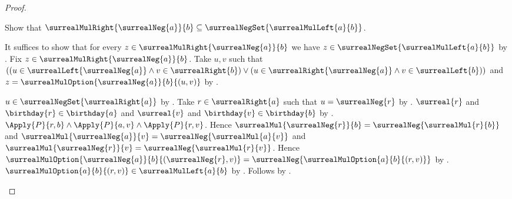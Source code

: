 \begin{proof}
\begin{subproof}
        Show that $\surrealMulRight{\surrealNeg{a}}{b}
            \subseteq\surrealNegSet{\surrealMulLeft{a}{b}}$.
        \begin{subproof}
            It suffices to show that for every
                $z\in\surrealMulRight{\surrealNeg{a}}{b}$ we have
                $z\in\surrealNegSet{\surrealMulLeft{a}{b}}$
                by .
            Fix $z\in\surrealMulRight{\surrealNeg{a}}{b}$.
            Take $u,v$ such that
                $((u\in\surrealLeft{\surrealNeg{a}}\land
                    v\in\surrealRight{b})
                  \lor
                  (u\in\surrealRight{\surrealNeg{a}}\land
                    v\in\surrealLeft{b}))$
                and $z=\surrealMulOption{\surrealNeg{a}}{b}{(u,v)}$
                by .
            \begin{byCase}
                    $u\in\surrealNegSet{\surrealRight{a}}$
                        by .
                    Take $r\in\surrealRight{a}$ such that
                        $u=\surrealNeg{r}$
                        by .
                    $\surreal{r}$ and
                        $\birthday{r}\in\birthday{a}$ and
                        $\surreal{v}$ and
                        $\birthday{v}\in\birthday{b}$
                        by .
                    $\Apply{P}{r,b}\land
                        \Apply{P}{a,v}\land
                        \Apply{P}{r,v}$.
                    Hence
                        $\surrealMul{\surrealNeg{r}}{b}
                            =\surrealNeg{\surrealMul{r}{b}}$ and
                        $\surrealMul{\surrealNeg{a}}{v}
                            =\surrealNeg{\surrealMul{a}{v}}$ and
                        $\surrealMul{\surrealNeg{r}}{v}
                            =\surrealNeg{\surrealMul{r}{v}}$.
                    Hence
                        $\surrealMulOption{\surrealNeg{a}}{b}
                            {(\surrealNeg{r},v)}
                        =\surrealNeg{\surrealMulOption{a}{b}{(r,v)}}$
                        by .
                    $\surrealMulOption{a}{b}{(r,v)}
                        \in\surrealMulLeft{a}{b}$
                        by .
                    Follows by .
\end{byCase}
\end{subproof}
\end{subproof}
\end{proof}
